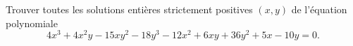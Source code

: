 Trouver toutes les solutions entières strictement positives $(x, y)$ de l'équation polynomiale
\[ 4x^3 + 4x^2y - 15xy^2 - 18y^3 - 12x^2 + 6xy + 36y^2 + 5x - 10y = 0. \]
